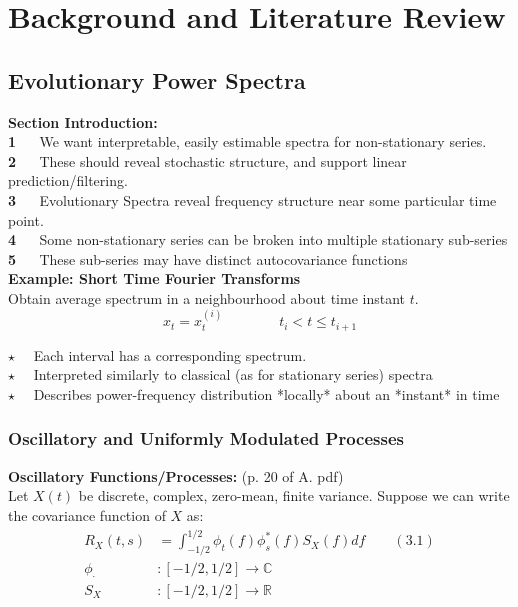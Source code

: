 \chapter{Background and Literature Review} \label{chap:chap2}
\setlength{\parindent}{0pt}

\section{Evolutionary Power Spectra}
\colorbox{briest}{\textbf{Section Introduction: } 
       }\\
\color{priest}
\textbf{1} $\quad$ We want interpretable, easily estimable spectra for non-stationary series. \\ 
\textbf{2} $\quad$ These should reveal stochastic structure, and support linear prediction/filtering.\\
\textbf{3} $\quad$ Evolutionary Spectra reveal frequency structure near some particular time point.\\
\textbf{4} $\quad$ Some non-stationary series can be broken into multiple stationary sub-series \\
\textbf{5} $\quad$ These sub-series may have distinct autocovariance functions \\

\color{black}
\colorbox{briest}{\textbf{Example: Short Time Fourier Transforms}}\\
\color{priest}
Obtain average spectrum in a neighbourhood about time instant $t$.
\[ x_t = x_t^{(i)} \qquad\qquad t_i < t \leq t_{i+1} \]

$\star\quad$ Each interval has a corresponding spectrum. \\
$\star\quad$ Interpreted similarly to classical (as for stationary series) spectra \\
$\star\quad$ Describes power-frequency distribution *locally* about an *instant* in time

{\color{black}\subsection{Oscillatory and Uniformly Modulated Processes}}
\color{azadeh}\colorbox{bzadeh}{\color{black}\textbf{Oscillatory Functions/Processes:}}  (p. 20 of A. pdf) \\
Let $X(t)$ be discrete, complex, zero-mean, finite variance. Suppose we can write the covariance function of $X$ as: 
\[
\begin{aligned}
    R_X(t,s) &= \int_{-1/2}^{1/2} \phi_t(f)\phi_s^*(f) S_X(f)df \qquad (3.1) 
    \\[5pt]
    \phi_\cdot &: [-1/2, 1/2] \to \mathbb{C} \\
    S_X &: [-1/2, 1/2] \to \mathbb{R}
\end{aligned}
\]

